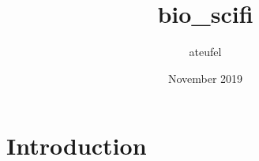 \documentclass{article}
\title{bio_scifi}
\author{ateufel }
\date{November 2019}
\begin{document}
\maketitle

\section{Introduction}
\end{document}
